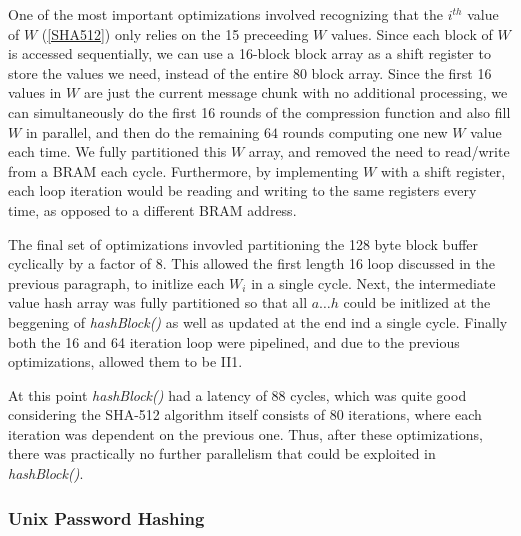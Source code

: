 One of the most important optimizations
involved recognizing that the $i^{th}$ value of $W$ (\ref{SHA512}) only relies on the 15 preceeding $W$ values.
Since each block of $W$ is accessed sequentially, we can use a 16-block block array as a shift register
to store the values we need, instead of the entire 80 block array. Since the first 16 values in $W$ are
just the current message chunk with no additional processing, we can simultaneously do the first 16
rounds of the compression function and also fill $W$ in parallel, and then do the remaining $64$ rounds
computing one new $W$ value each time. We fully partitioned this $W$ array, and removed the need
to read/write from a BRAM each cycle. Furthermore, by implementing $W$ with a shift register,
each loop iteration would be reading and writing to the same registers every time,
as opposed to a different BRAM address.

The final set of optimizations invovled partitioning the 128 byte block buffer
cyclically by a factor of 8. This allowed the first length 16 loop discussed
in the previous paragraph, to initlize each $W_i$ in a single cycle. Next, the
intermediate value hash array was fully partitioned so that all $a \ldots h$ could
be initlized at the beggening of \emph{hashBlock()} as well as updated
at the end ind a single cycle. Finally both the 16 and 64 iteration loop were
pipelined, and due to the previous optimizations, allowed them to be II1.


At this point \emph{hashBlock()} had a latency of 88 cycles, which was quite good
considering the SHA-512 algorithm itself consists of 80 iterations,
where each iteration was dependent on the previous one. Thus, after these optimizations,
there was practically no further parallelism that could be exploited in \emph{hashBlock()}.


\subsubsection{Unix Password Hashing}


